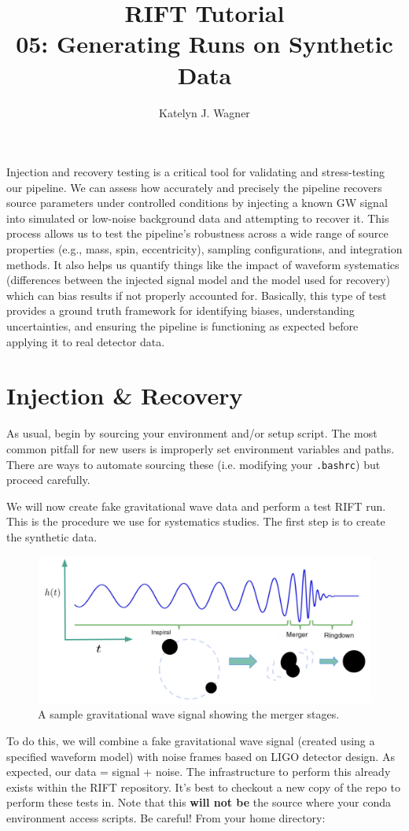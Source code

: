\documentclass{article}
\title{RIFT Tutorial \\
\large 05: Generating Runs on Synthetic Data}
\author{Katelyn J. Wagner}
\date{}
\begin{document}
\maketitle

Injection and recovery testing is a critical tool for validating and stress-testing our pipeline. We can assess how accurately and precisely the pipeline recovers source parameters under controlled conditions by injecting a known GW signal into simulated or low-noise background data and attempting to recover it. This process allows us to test the pipeline's robustness across a wide range of source properties (e.g., mass, spin, eccentricity), sampling configurations, and integration methods. It also helps us quantify things like the impact of waveform systematics (differences between the injected signal model and the model used for recovery) which can bias results if not properly accounted for. Basically, this type of test provides a ground truth framework for identifying biases, understanding uncertainties, and ensuring the pipeline is functioning as expected before applying it to real detector data.

\section*{Injection \& Recovery}
As usual, begin by sourcing your environment and/or setup script. The most common pitfall for new users is improperly set environment variables and paths. There are ways to automate sourcing these (i.e. modifying your \texttt{.bashrc}) but proceed carefully.

We will now create fake gravitational wave data and perform a test RIFT run. This is the procedure we use for systematics studies. The first step is to create the synthetic data.
\begin{figure}[h!]
    \centering
    \includegraphics[width=0.75\linewidth]{data.png}
    \caption{A sample gravitational wave signal showing the merger stages.}
    \label{fig:data}
\end{figure}
To do this, we will combine a fake gravitational wave signal (created using a specified waveform model) with noise frames based on LIGO detector design. As expected, our data = signal + noise. The infrastructure to perform this already exists within the RIFT repository. It's best to checkout a new copy of the repo to perform these tests in. Note that this \textbf{will not be} the source where your conda environment access scripts. Be careful! From your home directory:
\end{document}
